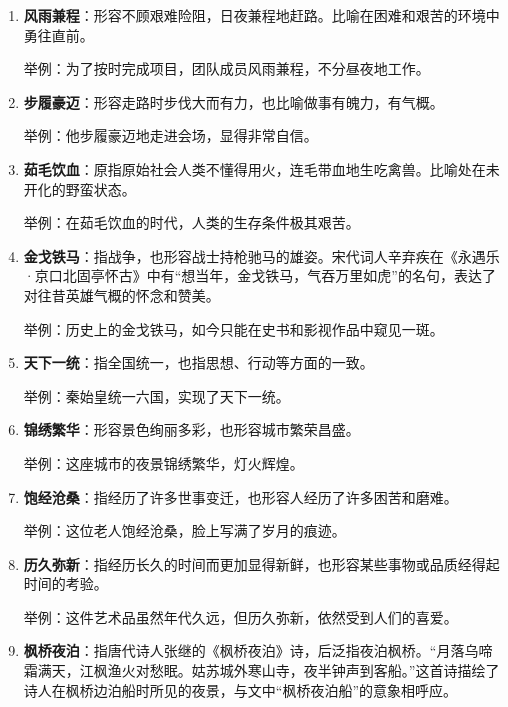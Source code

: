 \begin{enumerate}[leftmargin=*]
    \item \textbf{风雨兼程}：形容不顾艰难险阻，日夜兼程地赶路。比喻在困难和艰苦的环境中勇往直前。
    
    举例：为了按时完成项目，团队成员风雨兼程，不分昼夜地工作。
    
    \item \textbf{步履豪迈}：形容走路时步伐大而有力，也比喻做事有魄力，有气概。
    
    举例：他步履豪迈地走进会场，显得非常自信。
    
    \item \textbf{茹毛饮血}：原指原始社会人类不懂得用火，连毛带血地生吃禽兽。比喻处在未开化的野蛮状态。
    
    举例：在茹毛饮血的时代，人类的生存条件极其艰苦。
    
    \item \textbf{金戈铁马}：指战争，也形容战士持枪驰马的雄姿。宋代词人辛弃疾在《永遇乐·京口北固亭怀古》中有“想当年，金戈铁马，气吞万里如虎”的名句，表达了对往昔英雄气概的怀念和赞美。
    
    举例：历史上的金戈铁马，如今只能在史书和影视作品中窥见一斑。
    
    \item \textbf{天下一统}：指全国统一，也指思想、行动等方面的一致。
    
    举例：秦始皇统一六国，实现了天下一统。
    
    \item \textbf{锦绣繁华}：形容景色绚丽多彩，也形容城市繁荣昌盛。
    
    举例：这座城市的夜景锦绣繁华，灯火辉煌。
    
    \item \textbf{饱经沧桑}：指经历了许多世事变迁，也形容人经历了许多困苦和磨难。
    
    举例：这位老人饱经沧桑，脸上写满了岁月的痕迹。
    
    \item \textbf{历久弥新}：指经历长久的时间而更加显得新鲜，也形容某些事物或品质经得起时间的考验。
    
    举例：这件艺术品虽然年代久远，但历久弥新，依然受到人们的喜爱。
    
    \item \textbf{枫桥夜泊}：指唐代诗人张继的《枫桥夜泊》诗，后泛指夜泊枫桥。“月落乌啼霜满天，江枫渔火对愁眠。姑苏城外寒山寺，夜半钟声到客船。”这首诗描绘了诗人在枫桥边泊船时所见的夜景，与文中“枫桥夜泊船”的意象相呼应。
    

\end{enumerate}
